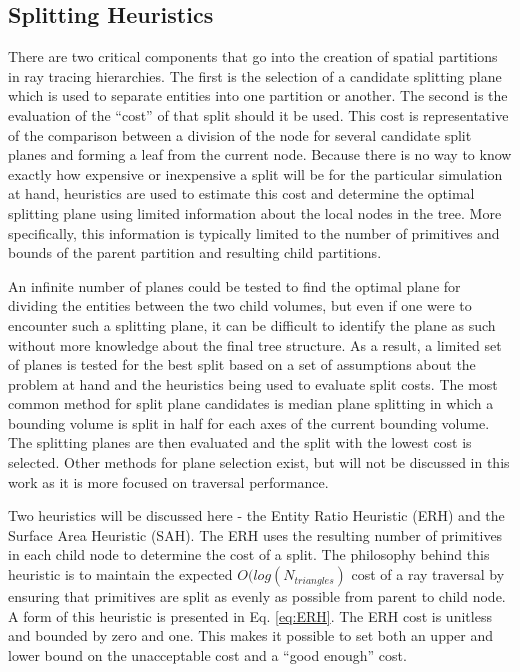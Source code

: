\subsection{Splitting Heuristics}

There are two critical components that go into the creation of spatial
partitions in ray tracing hierarchies. The first is the selection of a candidate
splitting plane which is used to separate entities into one partition or
another. The second is the evaluation of the ``cost'' of that split should it be
used. This cost is representative of the comparison between a division of the
node for several candidate split planes and forming a leaf from the current
node.  Because there is no way to know exactly how expensive or inexpensive a
split will be for the particular simulation at hand, heuristics are used to
estimate this cost and determine the optimal splitting plane using limited
information about the local nodes in the tree. More specifically, this
information is typically limited to the number of primitives and bounds of the
parent partition and resulting child partitions.

An infinite number of planes could be tested to find the optimal plane for
dividing the entities between the two child volumes, but even if one were to
encounter such a splitting plane, it can be difficult to identify the plane as
such without more knowledge about the final tree structure. As a result, a
limited set of planes is tested for the best split based on a set of assumptions
about the problem at hand and the heuristics being used to evaluate split
costs. The most common method for split plane candidates is median plane
splitting in which a bounding volume is split in half for each axes of the
current bounding volume. The splitting planes are then evaluated and the split
with the lowest cost is selected. Other methods for plane selection exist, but
will not be discussed in this work as it is more focused on traversal performance.

Two heuristics will be discussed here - the Entity Ratio Heuristic (ERH) and the
Surface Area Heuristic (SAH). The ERH uses the resulting number of
primitives in each child node to determine the cost of a split. The philosophy
behind this heuristic is to maintain the expected $O(log(N_{triangles})$ cost of
a ray traversal by ensuring that primitives are split as evenly as possible from
parent to child node. A form of this heuristic is presented in
Eq. \ref{eq:ERH}. The ERH cost is unitless and bounded by zero and
one. This makes it possible to set both an upper and lower bound on the
unacceptable cost and a ``good enough'' cost.


